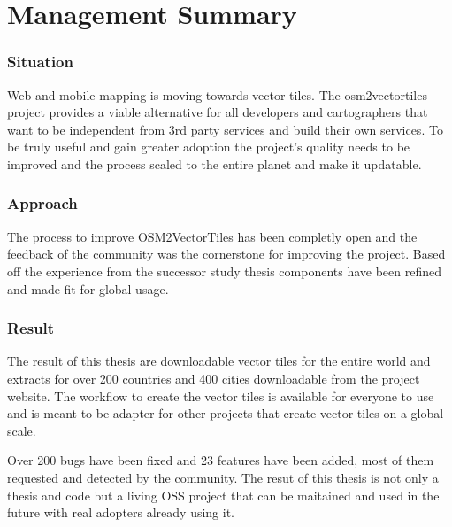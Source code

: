 
\begingroup
\let\clearpage\relax
\let\cleardoublepage\relax
\let\cleardoublepage\relax

\chapter*{Management Summary}
\label{management-summary}

\subsection*{Situation}\label{introduction}

Web and mobile mapping is moving towards vector tiles. The osm2vectortiles project provides a viable alternative for all developers and cartographers that want to be independent from 3rd party services and build their own services. To be truly useful and gain greater adoption the project's quality needs to be improved and the process scaled to the entire planet and make it updatable.

\newpage
\subsection*{Approach}

The process to improve OSM2VectorTiles has been completly open and the feedback of the community was the cornerstone for improving the project. Based off the experience from the successor study thesis components have been refined and made fit for global usage.

\subsection*{Result}

The result of this thesis are downloadable vector tiles for the entire world and extracts for over 200 countries and 400 cities downloadable from the project website. The workflow to create the vector tiles is available for everyone to use and is meant to be adapter for other projects that create vector tiles on a global scale.

Over 200 bugs have been fixed and 23 features have been added, most of them requested and detected by the community. The resut of this thesis is not only a thesis and code but a living OSS project that can be maitained and used in the future with real adopters already using it.


\endgroup

\vfill
